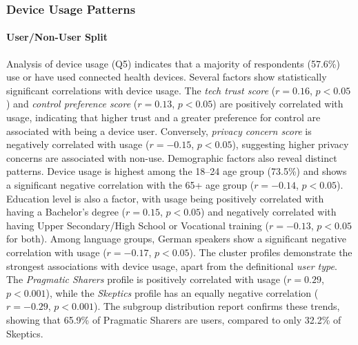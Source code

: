 	\subsubsection{Device Usage Patterns}

	\paragraph{User/Non-User Split}
	Analysis of device usage (Q5) indicates that a majority of respondents (57.6\%) use or have used connected health devices.
	Several factors show statistically significant correlations with device usage. The \textit{tech trust score} ($r = 0.16$, $p < 0.05$) and \textit{control preference score} ($r = 0.13$, $p < 0.05$) are positively correlated with usage, indicating that higher trust and a greater preference for control are associated with being a device user. Conversely, \textit{privacy concern score} is negatively correlated with usage ($r = -0.15$, $p < 0.05$), suggesting higher privacy concerns are associated with non-use.
	Demographic factors also reveal distinct patterns. Device usage is highest among the 18--24 age group (73.5\%) and shows a significant negative correlation with the 65+ age group ($r = -0.14$, $p < 0.05$). Education level is also a factor, with usage being positively correlated with having a Bachelor's degree ($r = 0.15$, $p < 0.05$) and negatively correlated with having Upper Secondary/High School or Vocational training ($r = -0.13$, $p < 0.05$ for both). Among language groups, German speakers show a significant negative correlation with usage ($r = -0.17$, $p < 0.05$).
	The cluster profiles demonstrate the strongest associations with device usage, apart from the definitional \textit{user type}. The \textit{Pragmatic Sharers} profile is positively correlated with usage ($r = 0.29$, $p < 0.001$), while the \textit{Skeptics} profile has an equally negative correlation ($r = -0.29$, $p < 0.001$). The subgroup distribution report confirms these trends, showing that 65.9\% of Pragmatic Sharers are users, compared to only 32.2\% of Skeptics.

